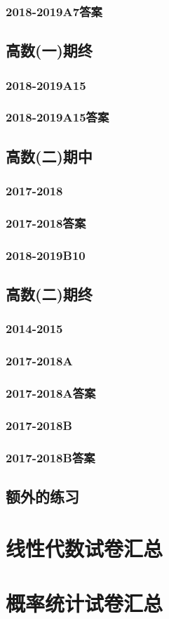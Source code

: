 \documentclass[cn,11pt,fancy,hide]{elegantbook}
\begin{document}
\subsection{2018-2019A7答案}




\section{高数(一)期终}
\subsection{2018-2019A15}
\subsection{2018-2019A15答案}




\section{高数(二)期中}
\subsection{2017-2018}
\subsection{2017-2018答案}
\subsection{2018-2019B10}




\section{高数(二)期终}
\subsection{2014-2015}
\subsection{2017-2018A}
\subsection{2017-2018A答案}
\subsection{2017-2018B}
\subsection{2017-2018B答案}

\section{额外的练习}
\chapter{线性代数试卷汇总}

\chapter{概率统计试卷汇总}
\end{document}
